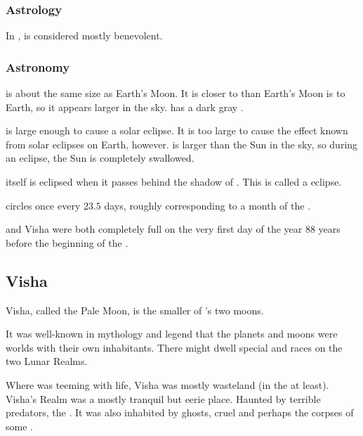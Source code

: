 \subsubsection{Astrology}
In , \Dun{} is considered mostly benevolent. 





\subsubsection{Astronomy}
\Dun{} is about the same size as Earth's Moon. It is closer to \Miith{} than Earth's Moon is to Earth, so it appears larger in the sky. \Dun{} has a dark gray \colour. 

\Dun{} is large enough to cause a solar eclipse. It is too large to cause the  effect known from solar eclipses on Earth, however. \Dun{} is larger than the Sun in the sky, so during an eclipse, the Sun is completely swallowed. 

\Dun{} itself is eclipsed when it passes behind the shadow of \Miith{}. This is called a \Dun{} eclipse. 

\Dun{} circles \Miith{} once every $23.5$ days, roughly corresponding to a month of the . 

\Dun and Visha were both completely full on the very first day of the year 88 years before the beginning of the . 









\subsection{Visha}
Visha, called the Pale Moon, is the smaller of \Miith{}'s two moons. 

It was well-known in mythology and legend that the planets and moons were worlds with their own inhabitants. 
There might dwell special \demihuman and \demiscatha races on the two Lunar Realms.

Where \Dun{} was teeming with life, Visha was mostly wasteland (in the  at least).
Visha's Realm was a mostly tranquil but eerie place. 
Haunted by terrible predators, the \vorcanths. 
It was also inhabited by ghosts, cruel  and perhaps the corpses of some . 

